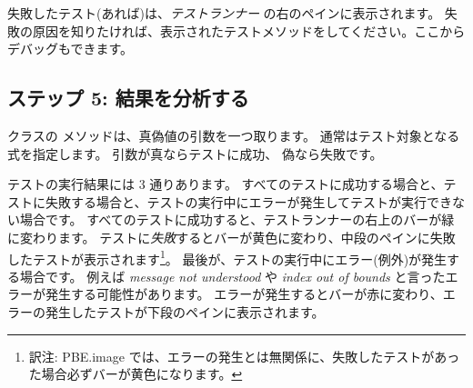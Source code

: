 \documentclass[a4paper,10pt,twoside]{book}
\begin{document}




失敗したテスト(あれば)は、\emph{テストランナー} の右のペインに表示されます。
失敗の原因を知りたければ、表示されたテストメソッドを{\click}してください。ここからデバッグもできます。

\subsection{ステップ 5: 結果を分析する}

 クラスの  メソッドは、真偽値の引数を一つ取ります。
通常はテスト対象となる式を指定します。
引数が真ならテストに成功、
偽なら失敗です。


テストの実行結果には 3 通りあります。
すべてのテストに成功する場合と、テストに失敗する場合と、テストの実行中にエラーが発生してテストが実行できない場合です。
すべてのテストに成功すると、テストランナーの右上のバーが緑に変わります。
テストに\emph{失敗}するとバーが黄色に変わり、中段のペインに失敗したテストが表示されます\footnote{訳注: PBE.image では、エラーの発生とは無関係に、失敗したテストがあった場合必ずバーが黄色になります。}。
最後が、テストの実行中にエラー(例外)が発生する場合です。
例えば \emph{message not understood} や \emph{index out of bounds} と言ったエラーが発生する可能性があります。
エラーが発生するとバーが赤に変わり、エラーの発生したテストが下段のペインに表示されます。
\end{document}
